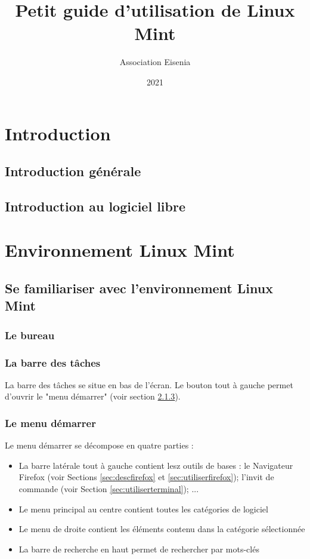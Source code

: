\documentclass[12pt]{book}
\title{Petit guide d'utilisation de Linux Mint}
\author{Association Eisenia}
\date{2021}
\begin{document}
\maketitle

\newpage
\renewcommand{\contentsname}{Table des matières}
\tableofcontents

\renewcommand{\chaptername}{Chapitre}
\chapter{Introduction}
	\section{Introduction générale}
	\section{Introduction au logiciel libre}

\chapter{Environnement Linux Mint}
\section{Se familiariser avec l'environnement Linux Mint}
	\subsection{Le bureau}
	\subsection{La barre des tâches}
		La barre des tâches se situe en bas de l'écran.
		Le bouton tout à gauche permet d'ouvrir le "menu démarrer" (voir section \ref{sec:menudemarrer}). 
	\subsection{Le menu démarrer}\label{sec:menudemarrer}
		Le menu démarrer se décompose en quatre parties :
		\begin{itemize}
			\item La barre latérale tout à gauche contient lesz outils de bases : le Navigateur Firefox (voir Sections \ref{sec:descfirefox} et \ref{sec:utiliserfirefox}); l'invit de commande (voir Section \ref{sec:utiliserterminal}); ...
			\item Le menu principal au centre contient toutes les catégories de logiciel
			\item Le menu de droite contient les éléments contenu dans la catégorie sélectionnée
			\item La barre de recherche en haut permet de rechercher par mots-clés 
		\end{itemize}
\end{document}

